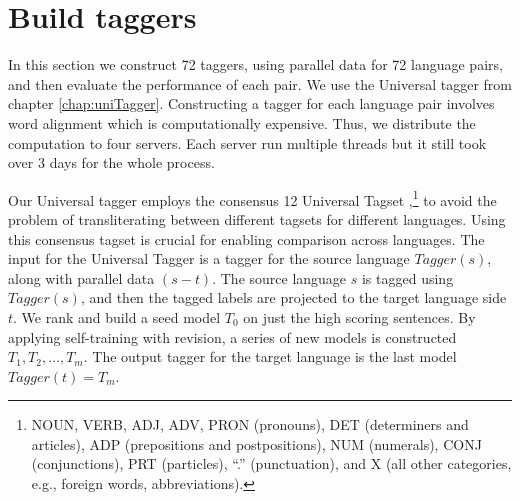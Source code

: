 

\section{Build taggers}
\label{sec:buildTagger}
In this section we construct 72 taggers, using parallel data for 72
language pairs, and then evaluate the performance of each pair. We
use the Universal tagger from chapter \ref{chap:uniTagger}. Constructing a tagger for each language pair involves word alignment which is computationally expensive. Thus, we distribute the computation to four servers. Each server run multiple threads but it still took over 3 days for the whole process. 

Our Universal tagger employs the consensus 12 Universal Tagset \cite{UniversalTagSet},\footnote{NOUN, VERB, ADJ, ADV, PRON (pronouns), DET (determiners and articles), ADP (prepositions and postpositions), NUM (numerals), CONJ (conjunctions), PRT (particles), ``.'' (punctuation), and X (all  other categories, e.g., foreign words, abbreviations). } to avoid the problem of transliterating between different tagsets for different languages. Using this consensus tagset is crucial for enabling comparison across languages. 
The input for the Universal Tagger is a tagger for the source language $Tagger(s)$, along with parallel data $(s-t)$. The source language $s$ is tagged using $Tagger(s)$, and then the tagged labels are projected to the target language side $t$. We rank and build a seed model $T_0$ on just the high scoring sentences. By applying self-training with revision, a series of new models is constructed $T_1,T_2,\ldots,T_m$. The output tagger for the target language is the last model $Tagger(t) = T_m$.

